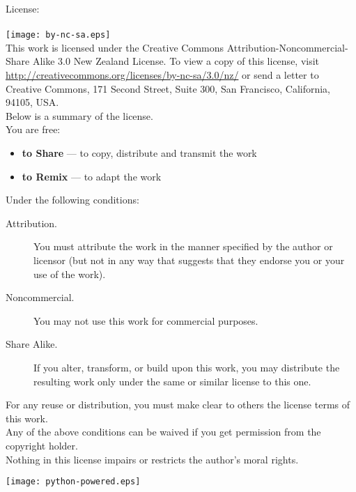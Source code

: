 \noindent
License:\\
\\
\texttt{[image: by-nc-sa.eps]}\\
This work is licensed under the Creative Commons Attribution-Noncommercial-Share Alike 3.0 New Zealand License. To view a copy of this license, visit\\ \href{http://creativecommons.org/licenses/by-nc-sa/3.0/nz/}{http://creativecommons.org/licenses/by-nc-sa/3.0/nz/} or send a letter to Creative Commons, 171 Second Street, Suite 300, San Francisco, California, 94105, USA.\\

\noindent
Below is a summary of the license.\\

\noindent
You are free:
\begin{itemize}
 \item \textbf{to Share} — to copy, distribute and transmit the work 
 \item \textbf{to Remix} — to adapt the work
\end{itemize}
\noindent
Under the following conditions:
\begin{description}
 \item[Attribution.] You must attribute the work in the manner specified by the author or licensor (but not in any way that suggests that they endorse you or your use of the work).
 \item[Noncommercial.] You may not use this work for commercial purposes.
 \item[Share Alike.] If you alter, transform, or build upon this work, you may distribute the resulting work only under the same or similar license to this one.
\end{description}

\noindent
For any reuse or distribution, you must make clear to others the license terms of this work.\\

\noindent
Any of the above conditions can be waived if you get permission from the copyright holder.\\

\noindent
Nothing in this license impairs or restricts the author's moral rights.\\

\vspace*{4cm}
\begin{center}
\texttt{[image: python-powered.eps]}
\end{center}

\mainmatter

\pagestyle{plain}

\tableofcontents